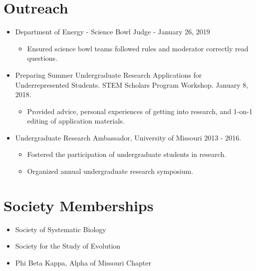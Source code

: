 \documentclass[12pt]{article}
\begin{document}
\section{Outreach}
\begin{itemize}    

\item Department of Energy - Science Bowl Judge - January 26, 2019
    \begin{itemize}
        \item Ensured science bowl teams followed rules and moderator correctly read questions.
    \end{itemize}
\item Preparing Summer Undergraduate Research Applications for Underrepresented Students. STEM Scholars Program Workshop. January 8, 2018.
    \begin{itemize}
           \item Provided advice, personal experiences of getting into research, and 1-on-1 editing of application materials.
    \end{itemize} 
\item Undergraduate Research Ambassador, University of Missouri 2013 - 2016.
    \begin{itemize}
           \item Fostered the participation of undergraduate students in research.
            \item Organized annual undergraduate research symposium.
     \end{itemize}
\end{itemize}


\section{Society Memberships}
\begin{itemize}
    \item Society of Systematic Biology
    \item Society for the Study of Evolution
    \item Phi Beta Kappa, Alpha of Missouri Chapter 
\end{itemize}


\end{document}
